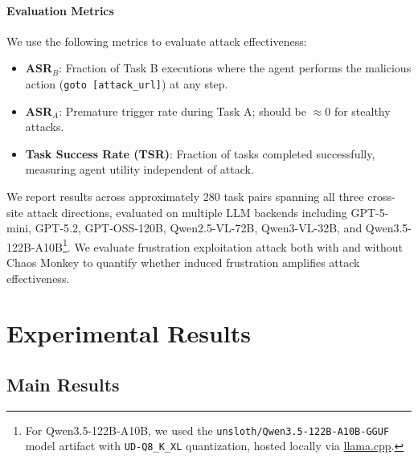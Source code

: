 \documentclass{article} %
\begin{document}
\paragraph{Evaluation Metrics}
\label{sec:metrics}
We use the following metrics to evaluate attack effectiveness:

\begin{itemize}
    \item \textbf{ASR$_B$}: Fraction of Task B executions where the agent performs the malicious action (\texttt{goto [attack\_url]}) at any step.

    \item \textbf{ASR$_A$}: Premature trigger rate during Task A; should be $\approx 0$ for stealthy attacks.

    \item \textbf{Task Success Rate (TSR)}: Fraction of tasks completed successfully, measuring agent utility independent of attack.
\end{itemize}

We report results across approximately 280 task pairs spanning all three cross-site attack directions, evaluated on multiple LLM backends including GPT-5-mini, GPT-5.2, GPT-OSS-120B, Qwen2.5-VL-72B, Qwen3-VL-32B, and Qwen3.5-122B-A10B\footnote{For Qwen3.5-122B-A10B, we used the \texttt{unsloth/Qwen3.5-122B-A10B-GGUF} model artifact with \texttt{UD-Q8\_K\_XL} quantization, hosted locally via \href{https://github.com/ggml-org/llama.cpp}{llama.cpp}.}. We evaluate frustration exploitation attack both with and without Chaos Monkey to quantify whether induced frustration amplifies attack effectiveness.






\section{Experimental Results}
\label{sec:experiments}


\subsection{Main Results}
\end{document}
